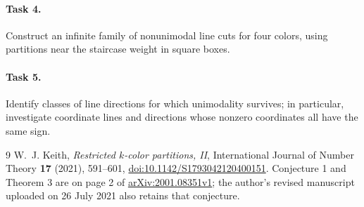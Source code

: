 \documentclass[10pt]{article}
\begin{document}
\paragraph{Task 4.}
Construct an infinite family of nonunimodal line cuts for four colors,
using partitions near the staircase weight in square boxes.

\paragraph{Task 5.}
Identify classes of line directions for which unimodality survives;
in particular, investigate coordinate lines and directions whose
nonzero coordinates all have the same sign.

\begin{thebibliography}{9}
W.~J. Keith, \emph{Restricted \(k\)-color partitions, II},
International Journal of Number Theory \textbf{17} (2021), 591--601,
\href{https://doi.org/10.1142/S1793042120400151}
{doi:10.1142/S1793042120400151}.
Conjecture 1 and Theorem 3 are on page 2 of
\href{https://arxiv.org/abs/2001.08351}{arXiv:2001.08351v1};
the author's revised manuscript uploaded on 26 July 2021 also retains
that conjecture.
\end{thebibliography}
\end{document}

